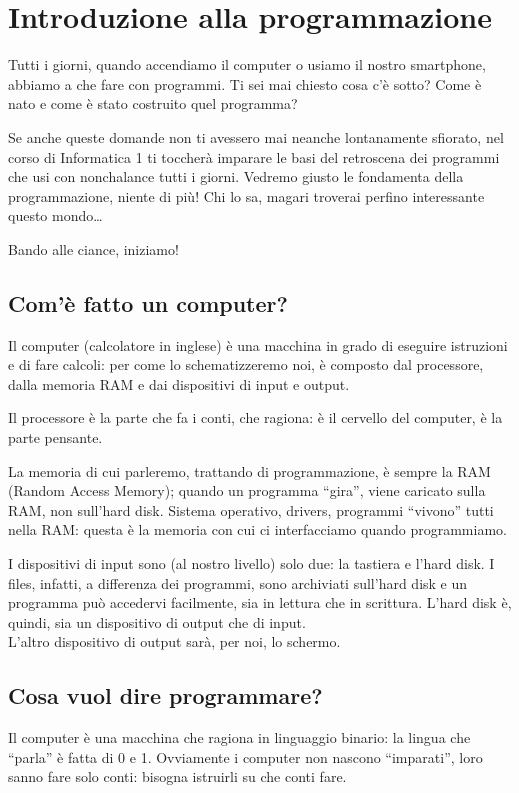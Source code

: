 \chapter{Introduzione alla programmazione}
Tutti i giorni, quando accendiamo il computer o usiamo il nostro smartphone, abbiamo a che fare con programmi. Ti sei mai chiesto cosa c'è sotto? Come è nato e come è stato costruito quel programma?

Se anche queste domande non ti avessero mai neanche lontanamente sfiorato, nel corso di Informatica 1 ti toccherà imparare le basi del retroscena dei programmi che usi con nonchalance tutti i giorni. Vedremo giusto le fondamenta della programmazione, niente di più! Chi lo sa, magari troverai perfino interessante questo mondo\ldots

Bando alle ciance, iniziamo!
\section{Com'è fatto un computer?}
Il computer (calcolatore in inglese) è una macchina in grado di eseguire istruzioni e di fare calcoli:  per come lo schematizzeremo noi, è composto dal processore, dalla memoria RAM e dai dispositivi di input e output. 

Il processore è la parte che fa i conti, che ragiona: è il cervello del computer, è la parte pensante.

La memoria di cui parleremo, trattando di programmazione, è sempre la RAM (Random Access Memory); quando un programma ``gira'', viene caricato sulla RAM, non sull'hard disk. Sistema operativo, drivers, programmi ``vivono'' tutti nella RAM: questa è la memoria con cui ci interfacciamo quando programmiamo. 

I dispositivi di input sono (al nostro livello) solo due: la tastiera e l'hard disk. I files, infatti, a differenza dei programmi, sono archiviati sull'hard disk e un programma può accedervi facilmente, sia in lettura che in scrittura. L'hard disk è, quindi, sia un dispositivo di output che di input.
\\L'altro dispositivo di output sarà, per noi, lo schermo.

\section{Cosa vuol dire programmare?}
Il computer è una macchina che ragiona in linguaggio binario: la lingua che ``parla'' è fatta di 0 e 1. Ovviamente i computer non nascono ``imparati'', loro sanno fare solo conti: bisogna istruirli su che conti fare. 

